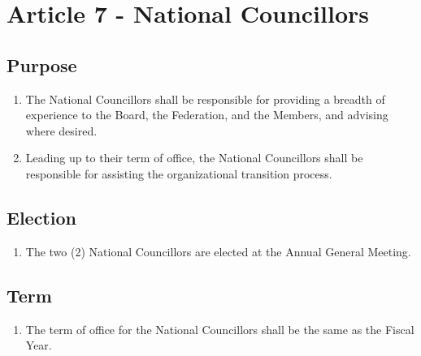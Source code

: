 \section{Article 7 - National Councillors}
\label{article-7-national-councillors}

\subsection{Purpose}
\label{purpose-national-councillors}

\begin{enumerate}
 \item The National Councillors shall be responsible for providing a breadth of experience to the Board, the Federation, and the Members, and advising where desired.
 \item Leading up to their term of office, the National Councillors shall be responsible for assisting the organizational transition process.
\end{enumerate}

\subsection{Election}
\label{election-national-councillors}

\begin{enumerate}
 \item The two (2) National Councillors are elected at the Annual General Meeting.
\end{enumerate}

\subsection{Term}
\label{term-national-councillors}

\begin{enumerate}
 \item The term of office for the National Councillors shall be the same as the Fiscal Year.
\end{enumerate}
